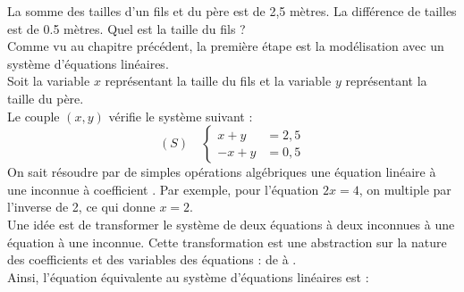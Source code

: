 \documentclass{book}
\begin{document}
\begin{Exemple}
La somme des tailles d'un fils et du père est de 2,5 mètres. La différence de tailles  est de 0.5 mètres.
Quel est la taille du fils ? \\
Comme vu au chapitre précédent, la première étape est la modélisation avec un système d'équations linéaires.\\
Soit la variable $x$ représentant la taille du fils et la variable $y$ représentant la taille du père.\\
Le couple $(x,y)$ vérifie le système suivant  :
$$(S)\quad \begin{cases}
x+y&=2,5\\
-x+y&=0,5
\end{cases}
$$
On sait résoudre par de simples opérations algébriques une équation linéaire à une inconnue à coefficient . Par exemple, pour l'équation $2x=4$, on multiple par l'inverse de 2, ce qui donne $x=2$.\\
Une idée est de transformer le système de deux équations à deux inconnues à une équation à une inconnue. Cette transformation est une abstraction sur la nature des coefficients et des variables des équations : de  à  .\\
Ainsi, l'équation équivalente au système d'équations linéaires est  :
\begin{center}
\end{center}
\end{Exemple}
\end{document}
